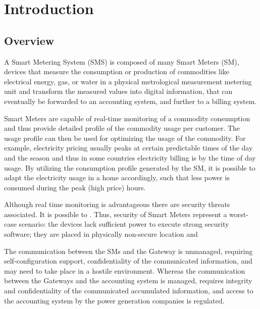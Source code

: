 \chapter{Introduction}
\section{Overview}
A Smart Metering System (SMS) is composed of many Smart Meters (SM), devices that measure the consumption or production of commodities like electrical energy, gas, or water in a physical metrological measurement metering unit and transform the measured values into digital information, that can eventually be forwarded to an accounting system, and further to a billing system. 


Smart Meters are capable of real-time monitoring of a commodity consumption and thus provide detailed profile of the commodity usage per customer. The usage profile can then be used for optimizing the usage of the commodity. For example, electricity pricing usually peaks at certain predictable times of the day and the season and thus in some countries electricity billing is by the time of day usage. By utilizing the consumption profile generated by the SM, it is possible to adapt the electricity usage in a home accordingly, such that less power is consumed during the peak (high price) hours.

Although real time monitoring is advantageous there are security threats associated. It is possible to .
Thus, security of Smart Meters represent a worst-case scenario: the devices lack sufficient power to execute strong security software; they are placed in physically non-secure location and  

The communication between the SMs and the Gateway is unmanaged, requiring self-configuration support, confidentiality of the communicated information, and may need to take place in a hostile environment. Whereas the communication between the Gateways and the accounting system is managed, requires integrity and confidentiality of the communicated accumulated information, and access to the accounting system by the power generation companies is regulated.

